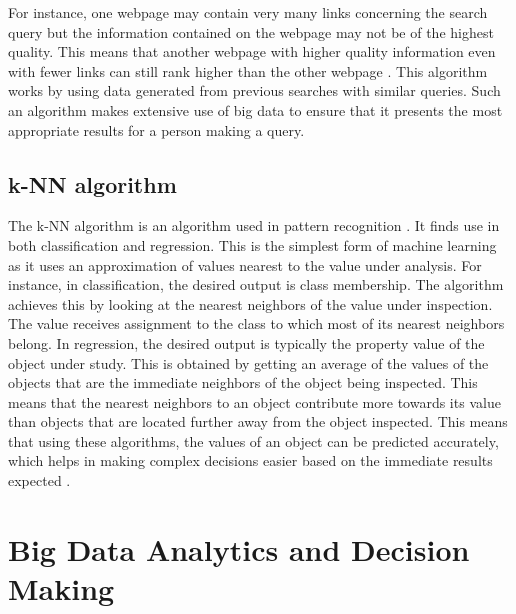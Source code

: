 \documentclass[sigconf]{acmart}
\begin{document}
For instance, one webpage may contain very many links concerning the search query but the information contained on the webpage may not be of the highest quality. This means that another webpage with higher quality information even with fewer links can still rank higher than the other webpage \cite{Langville2006}. This algorithm works by using data generated from previous searches with similar queries. Such an algorithm makes extensive use of big data to ensure that it presents the most appropriate results for a person making a query. 


\subsection{k-NN algorithm}
The k-NN algorithm is an algorithm used in pattern recognition \cite{Yingmin2017}. It finds use in both classification and regression. This is the simplest form of machine learning as it uses an approximation of values nearest to the value under analysis. For instance, in classification, the desired output is class membership. The algorithm achieves this by looking at the nearest neighbors of the value under inspection. The value receives assignment to the class to which most of its nearest neighbors belong. In regression, the desired output is typically the property value of the object under study. This is obtained by getting an average of the values of the objects that are the immediate neighbors of the object being inspected. This means that the nearest neighbors to an object contribute more towards its value than objects that are located further away from the object inspected. This means that using these algorithms, the values of an object can be predicted accurately, which helps in making complex decisions easier based on the immediate results expected \cite{Yingmin2017}.

\section{Big Data Analytics and Decision Making}
\end{document}
